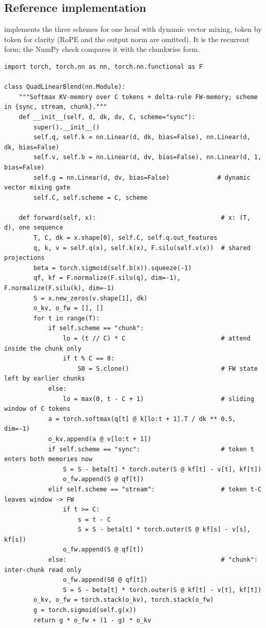 \subsection{Reference implementation}

 implements the three schemes for one head with dynamic vector mixing,
token by token for clarity (RoPE and the output norm are omitted). It is the recurrent form; the
NumPy check compares it with the chunkwise form.

\begin{lstlisting}[caption={Reference implementation (ours): quadratic-linear blending with the three schemes, one head.},label={lst:c12-hqlt-ref}]
import torch, torch.nn as nn, torch.nn.functional as F

class QuadLinearBlend(nn.Module):
    """Softmax KV-memory over C tokens + delta-rule FW-memory; scheme in {sync, stream, chunk}."""
    def __init__(self, d, dk, dv, C, scheme="sync"):
        super().__init__()
        self.q, self.k = nn.Linear(d, dk, bias=False), nn.Linear(d, dk, bias=False)
        self.v, self.b = nn.Linear(d, dv, bias=False), nn.Linear(d, 1, bias=False)
        self.g = nn.Linear(d, dv, bias=False)             # dynamic vector mixing gate
        self.C, self.scheme = C, scheme

    def forward(self, x):                                  # x: (T, d), one sequence
        T, C, dk = x.shape[0], self.C, self.q.out_features
        q, k, v = self.q(x), self.k(x), F.silu(self.v(x))  # shared projections
        beta = torch.sigmoid(self.b(x)).squeeze(-1)
        qf, kf = F.normalize(F.silu(q), dim=-1), F.normalize(F.silu(k), dim=-1)
        S = x.new_zeros(v.shape[1], dk)
        o_kv, o_fw = [], []
        for t in range(T):
            if self.scheme == "chunk":
                lo = (t // C) * C                          # attend inside the chunk only
                if t % C == 0:
                    S0 = S.clone()                         # FW state left by earlier chunks
            else:
                lo = max(0, t - C + 1)                     # sliding window of C tokens
            a = torch.softmax(q[t] @ k[lo:t + 1].T / dk ** 0.5, dim=-1)
            o_kv.append(a @ v[lo:t + 1])
            if self.scheme == "sync":                      # token t enters both memories now
                S = S - beta[t] * torch.outer(S @ kf[t] - v[t], kf[t])
                o_fw.append(S @ qf[t])
            elif self.scheme == "stream":                  # token t-C leaves window -> FW
                if t >= C:
                    s = t - C
                    S = S - beta[t] * torch.outer(S @ kf[s] - v[s], kf[s])
                o_fw.append(S @ qf[t])
            else:                                          # "chunk": inter-chunk read only
                o_fw.append(S0 @ qf[t])
                S = S - beta[t] * torch.outer(S @ kf[t] - v[t], kf[t])
        o_kv, o_fw = torch.stack(o_kv), torch.stack(o_fw)
        g = torch.sigmoid(self.g(x))
        return g * o_fw + (1 - g) * o_kv
\end{lstlisting}

